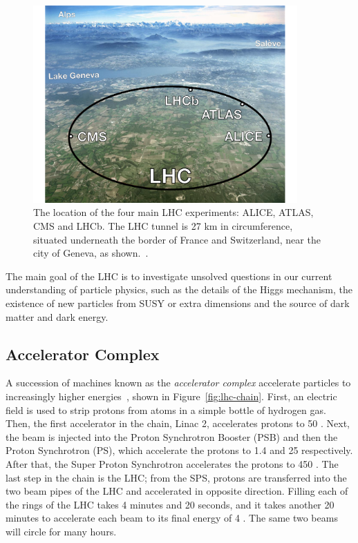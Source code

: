 \begin{figure}[tp]
  \centering
  \includegraphics[width=0.90\textwidth]{fig/atlas/lhc-aerial.pdf}
  \caption{The location of the four main LHC experiments: ALICE, ATLAS, CMS and LHCb. The LHC tunnel is 27 km in circumference, situated underneath the border of France and Switzerland, near the city of Geneva, as shown.~\cite{atlas-surface}.}
  \label{fig:lhc-exp}
\end{figure}

The main goal of the LHC is to investigate unsolved questions in our current understanding of particle physics, such as the details of the Higgs mechanism, the existence of new particles from SUSY or extra dimensions and the source of dark matter and dark energy.
\subsection{Accelerator Complex}
A succession of machines known as the \emph{accelerator complex} accelerate particles to increasingly higher energies~\cite{cern-jinst-lhc}, shown in Figure~\ref{fig:lhc-chain}. First, an electric field is used to strip protons from atoms in a simple bottle of hydrogen gas. Then, the first accelerator in the chain, Linac 2, accelerates protons to 50 \mev. Next, the beam is injected into the Proton Synchrotron Booster (PSB) and then the Proton Synchrotron (PS), which accelerate the protons to 1.4 \gev and 25 \gev respectively. After that, the Super Proton Synchrotron accelerates the protons to 450 \gev. The last step in the chain is the LHC; from the SPS, protons are transferred into the two beam pipes of the LHC and accelerated in opposite direction. Filling each of the rings of the LHC takes 4 minutes and 20 seconds, and it takes another 20 minutes to accelerate each beam to its final energy of 4 \tev. The same two beams will circle for many hours.

